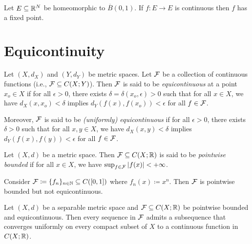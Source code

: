 \documentclass[screen,single]{techreport}
\numberwithin{equation}{section}
\begin{document}
\begin{theorem}\label{The:BrouwerFixedPoint}
  Let $E \subseteq \mathbb{R}^N$ be homeomorphic to $\overline{B}(0,1)$.
  If $f : E \to E$ is continuous then $f$ has a fixed point.
\end{theorem}

\section{Equicontinuity}

\begin{definition}\label{De:Equicont}
  Let $(X,d_X)$ and $(Y,d_Y)$ be metric spaces.
  Let $\mathcal{F}$ be a collection of continuous functions (i.e., $\mathcal{F} \subseteq C(X;Y)$).
  Then $\mathcal{F}$ is said to be \emph{equicontinuous} at a point $x_o \in X$ if for all $\epsilon > 0$, there exists $\delta = \delta(x_o,\epsilon) > 0$ such that for all $x \in X$, we have $d_X(x,x_o) < \delta$ implies $d_Y(f(x),f(x_o)) < \epsilon$ for all $f \in \mathcal{F}$.
  
  Moreover, $\mathcal{F}$ is said to be \emph{(uniformly) equicontinuous} if for all $\epsilon > 0$, there exists $\delta > 0$ such that for all $x,y \in X$, we have $d_X(x,y) < \delta$ implies $d_Y(f(x),f(y)) < \epsilon$ for all $f \in \mathcal{F}$.
\end{definition}

\begin{definition}\label{De:PointwiseBounded}
  Let $(X,d)$ be a metric space.
  Then $\mathcal{F} \subseteq C(X;\mathbb{R})$ is said to be \emph{pointwise bounded} if for all $x \in X$, we have $\sup_{f \in \mathcal{F}} |f(x)| < +\infty$.
\end{definition}

\begin{remark}\label{Rem:PointBoundedButNotEquicont}
  Consider $\mathcal{F} \coloneqq \{ f_n\}_{n \in \mathbb{N}} \subseteq C([0,1])$ where $f_n(x) \coloneqq x^n$.
  Then $\mathcal{F}$ is pointwise bounded but not equicontinuous.
\end{remark}

\begin{theorem}\label{The:AscoliArzela}
  Let $(X,d)$ be a separable metric space and $\mathcal{F} \subseteq C(X;\mathbb{R})$ be pointwise bounded and equicontinuous.
  Then every sequence in $\mathcal{F}$ admits a subsequence that converges uniformly on every compact subset of $X$ to a continuous function in $C(X;\mathbb{R})$.
\end{theorem}
\end{document}

